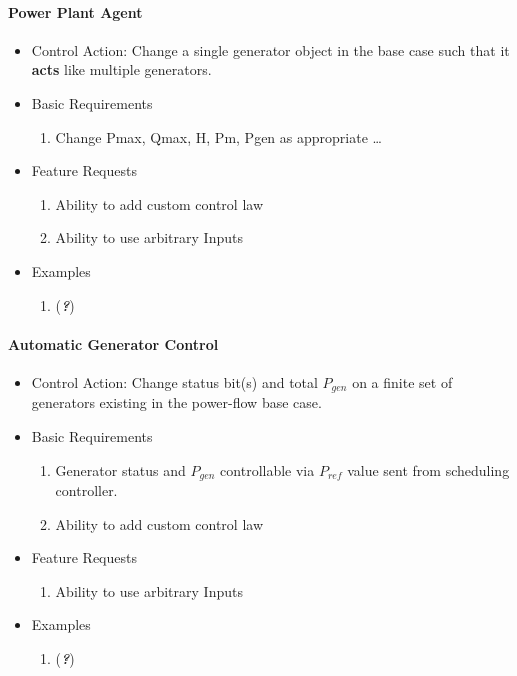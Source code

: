 \documentclass[12pt]{article}
\newcommand{\q}{(\textit{\textbf{?}})}
\begin{document}
\begin{multicols*}{2}
\raggedright

\paragraph{Power Plant Agent}
\begin{itemize}
	\item Control Action: Change a single generator object in the base case such that it \textbf{acts} like multiple generators.
	\item Basic Requirements
	\begin{enumerate}
		\item Change Pmax, Qmax, H, Pm, Pgen as appropriate \ldots
	\end{enumerate}
	\item Feature Requests
	\begin{enumerate}
		\item Ability to add custom control law
		\item Ability to use arbitrary Inputs
	\end{enumerate}
	\item Examples
	\begin{enumerate}
	\item \q
	\end{enumerate}	
\end{itemize}
	
\paragraph{Automatic Generator Control}
\begin{itemize}
	\item Control Action: Change status bit(s) and total $P_{gen}$ on a finite set of generators existing in the power-flow base case.
	\item Basic Requirements
	\begin{enumerate}
		\item  Generator status and $P_{gen}$ controllable via $P_{ref}$ value sent from scheduling controller.
		\item Ability to add custom control law
	\end{enumerate}
	\item Feature Requests
	\begin{enumerate}
		\item Ability to use arbitrary Inputs
	\end{enumerate}
	\item Examples
	\begin{enumerate}
	\item \q
	\end{enumerate}	
\end{itemize}
\vfill\null
\end{multicols*}
\end{document}
